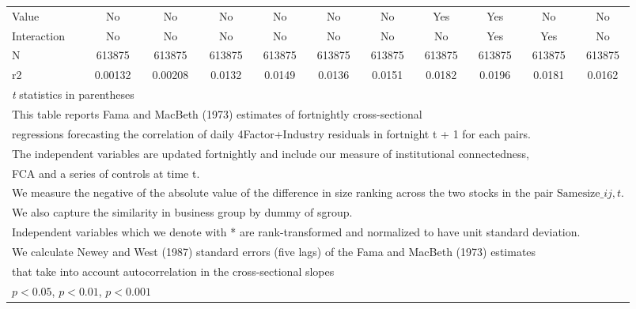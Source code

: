 {\begin{tabular}{l*{10}{c}}
\hline
Value               &          No         &          No         &          No         &          No         &          No         &          No         &         Yes         &         Yes         &          No         &          No         \\
Interaction         &          No         &          No         &          No         &          No         &          No         &          No         &          No         &         Yes         &         Yes         &          No         \\
N                   &      613875         &      613875         &      613875         &      613875         &      613875         &      613875         &      613875         &      613875         &      613875         &      613875         \\
r2                  &     0.00132         &     0.00208         &      0.0132         &      0.0149         &      0.0136         &      0.0151         &      0.0182         &      0.0196         &      0.0181         &      0.0162         \\
\hline\hline
\multicolumn{11}{l}{\footnotesize \textit{t} statistics in parentheses}\\
\multicolumn{11}{l}{\footnotesize This table reports Fama and MacBeth (1973) estimates of fortnightly cross-sectional}\\
\multicolumn{11}{l}{\footnotesize  regressions forecasting the correlation of daily 4Factor+Industry residuals in fortnight t + 1 for each pairs.}\\
\multicolumn{11}{l}{\footnotesize The independent variables are updated fortnightly and include our measure of institutional connectedness,}\\
\multicolumn{11}{l}{\footnotesize  FCA and a series of controls at time t.}\\
\multicolumn{11}{l}{\footnotesize We measure the negative of the absolute value of the difference in size ranking across the two stocks in the pair $ \text{Samesize}\_{ij,t} $.}\\
\multicolumn{11}{l}{\footnotesize We also capture the similarity in business group by dummy of sgroup.}\\
\multicolumn{11}{l}{\footnotesize Independent variables which  we denote with * are rank-transformed and normalized to have unit standard deviation.}\\
\multicolumn{11}{l}{\footnotesize  We calculate Newey and West (1987) standard errors (five lags) of the Fama and MacBeth (1973) estimates }\\
\multicolumn{11}{l}{\footnotesize  that take into account autocorrelation in the cross-sectional slopes}\\
\multicolumn{11}{l}{\footnotesize \sym{*} \(p<0.05\), \sym{**} \(p<0.01\), \sym{***} \(p<0.001\)}\\
\end{tabular}
}

